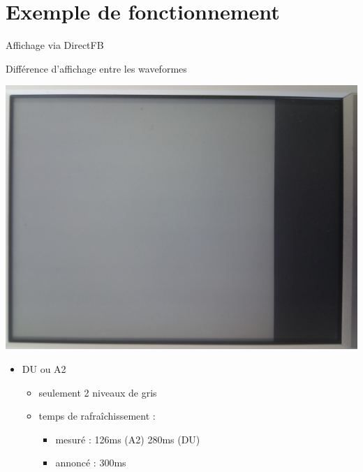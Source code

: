 \section[Fonctionnement]{Exemple de fonctionnement}

\begin{frame}{ Affichage via DirectFB }
	\begin{block} { Différence d'affichage entre les waveformes }
		\parbox{0.3\linewidth}{
			\includegraphics[angle=-90,origin=c,scale=0.04]{du_a2.jpg}
		}
		\parbox{0.6\linewidth}{
			\begin{itemize}
				\item DU ou A2
				\begin{itemize}
					\item seulement 2 niveaux de gris
					\item temps de rafraîchissement : 
					\begin{itemize}
						\item mesuré  : 126ms (A2) 280ms (DU)
						\item annoncé  : 300ms
					\end{itemize}		
				\end{itemize}
			\end{itemize}
		}
	\end{block}
\end{frame}

